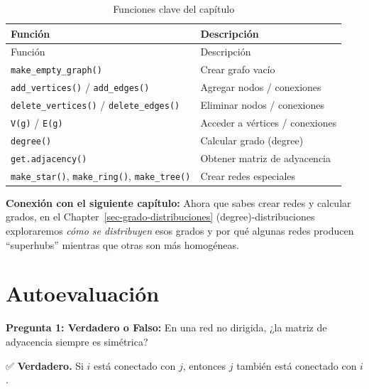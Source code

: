 \documentclass[
  letterpaper,
  DIV=11,
  numbers=noendperiod]{scrreprt}
\begin{document}
\begin{longtable}[]{@{}ll@{}}
\caption{Funciones clave del capítulo}\tabularnewline
\toprule\noalign{}
Función & Descripción \\
\midrule\noalign{}
\endfirsthead
\toprule\noalign{}
Función & Descripción \\
\midrule\noalign{}
\endhead
\bottomrule\noalign{}
\endlastfoot
\texttt{make\_empty\_graph()} & Crear grafo vacío \\
\texttt{add\_vertices()} / \texttt{add\_edges()} & Agregar nodos /
conexiones \\
\texttt{delete\_vertices()} / \texttt{delete\_edges()} & Eliminar nodos
/ conexiones \\
\texttt{V(g)} / \texttt{E(g)} & Acceder a vértices / conexiones \\
\texttt{degree()} & Calcular grado (degree) \\
\texttt{get.adjacency()} & Obtener matriz de adyacencia \\
\texttt{make\_star()}, \texttt{make\_ring()}, \texttt{make\_tree()} &
Crear redes especiales \\
\end{longtable}

\textbf{Conexión con el siguiente capítulo:} Ahora que sabes crear redes
y calcular grados, en el Chapter~\ref{sec-grado-distribuciones}
(degree)-distribuciones exploraremos \emph{cómo se distribuyen} esos
grados y por qué algunas redes producen ``superhubs'' mientras que otras
son más homogéneas.

\section*{Autoevaluación}\label{autoevaluaciuxf3n}


\textbf{Pregunta 1: Verdadero o Falso:} En una red no dirigida, ¿la
matriz de adyacencia siempre es simétrica?

\begin{tcolorbox}[enhanced jigsaw, toprule=.15mm, colframe=quarto-callout-caution-color-frame, coltitle=black, titlerule=0mm, colback=white, breakable, leftrule=.75mm, arc=.35mm, bottomtitle=1mm, toptitle=1mm, rightrule=.15mm, bottomrule=.15mm, left=2mm, title=\textcolor{quarto-callout-caution-color}{\faFire}\hspace{0.5em}{Respuesta 1}, colbacktitle=quarto-callout-caution-color!10!white, opacityback=0, opacitybacktitle=0.6]

✅ \textbf{Verdadero.} Si \(i\) está conectado con \(j\), entonces \(j\)
también está conectado con \(i\).

\end{tcolorbox}
\end{document}
